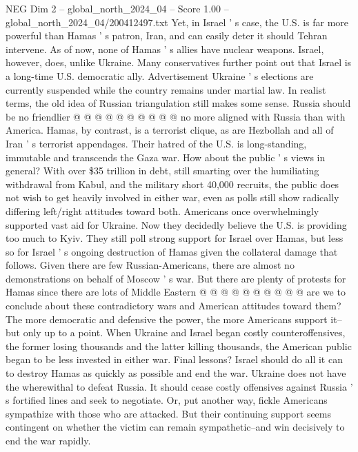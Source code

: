 \begin{textsample}{NEG Dim 2 – global\_north\_2024\_04 – Score 1.00 – global\_north\_2024\_04/200412497.txt}
Yet, in Israel ' s case, the U.S. is far more powerful than Hamas ' s patron, Iran, and can easily deter it should Tehran intervene.
As of now, none of Hamas ' s allies have nuclear weapons.
Israel, however, does, unlike Ukraine.
Many conservatives further point out that Israel is a long-time U.S. democratic ally.
Advertisement Ukraine ' s elections are currently suspended while the country remains under martial law.
In realist terms, the old idea of Russian triangulation still makes some sense.
Russia should be no friendlier @ @ @ @ @ @ @ @ @ @ no more aligned with Russia than with America.
Hamas, by contrast, is a terrorist clique, as are Hezbollah and all of Iran ' s terrorist appendages.
Their hatred of the U.S. is long-standing, immutable and transcends the Gaza war.
How about the public ' s views in general?
With over \$35 trillion in debt, still smarting over the humiliating withdrawal from Kabul, and the military short 40,000 recruits, the public does not wish to get heavily involved in either war, even as polls still show radically differing left/right attitudes toward both.
Americans once overwhelmingly supported vast aid for Ukraine.
Now they decidedly believe the U.S. is providing too much to Kyiv.
They still poll strong support for Israel over Hamas, but less so for Israel ' s ongoing destruction of Hamas given the collateral damage that follows.
Given there are few Russian-Americans, there are almost no demonstrations on behalf of Moscow ' s war.
But there are plenty of protests for Hamas since there are lots of Middle Eastern @ @ @ @ @ @ @ @ @ @ are we to conclude about these contradictory wars and American attitudes toward them?
The more democratic and defensive the power, the more Americans support it--but only up to a point.
When Ukraine and Israel began costly counteroffensives, the former losing thousands and the latter killing thousands, the American public began to be less invested in either war.
Final lessons?
Israel should do all it can to destroy Hamas as quickly as possible and end the war.
Ukraine does not have the wherewithal to defeat Russia.
It should cease costly offensives against Russia ' s fortified lines and seek to negotiate.
Or, put another way, fickle Americans sympathize with those who are attacked.
But their continuing support seems contingent on whether the victim can remain sympathetic--and win decisively to end the war rapidly.

\end{textsample}
